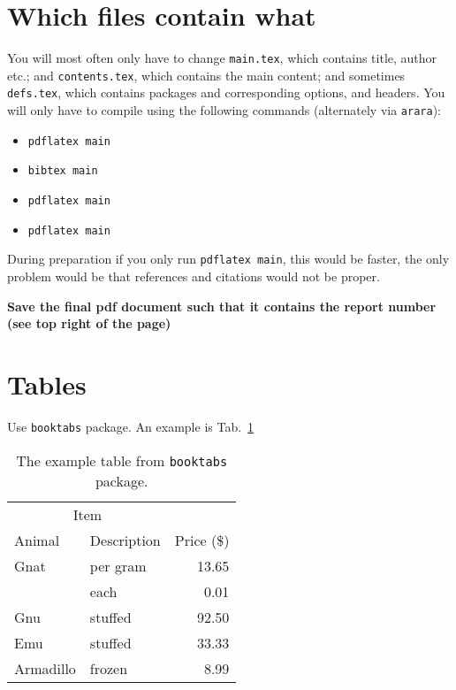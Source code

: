 \lipsum\cite{Karamcheti1956}

\section{Which files contain what}

You will most often only have to change \texttt{main.tex}, which contains
title, author etc.; and \texttt{contents.tex}, which contains the main content;
and sometimes \texttt{defs.tex}, which contains packages and corresponding
options, and headers. You will only have to compile using the following
commands (alternately via \texttt{arara}):
\begin{itemize}
	\item \texttt{pdflatex main}
	\item \texttt{bibtex main}
	\item \texttt{pdflatex main}
	\item \texttt{pdflatex main}
\end{itemize}

During preparation if you only run \texttt{pdflatex main}, this would be
faster, the only problem would be that references and citations would not be
proper.

\textbf{Save the final pdf document such that it contains the report number
(see top right of the page)}

\section{Tables}

Use \texttt{booktabs} package. An example is Tab.~\ref{tb:sample}

\begin{table}
\caption{The example table from \texttt{booktabs} package.}
	\label{tb:sample}
	\centering
\begin{tabular}{@{}llr@{}}
\toprule
\multicolumn{2}{c}{Item} \\
\cmidrule(r){1-2}Animal & Description & Price (\$)\\
\midrule
Gnat  & per gram  & 13.65 \\
& each      & 0.01 \\
Gnu   & stuffed   & 92.50 \\
Emu   & stuffed   & 33.33 \\
Armadillo & frozen & 8.99 \\
\bottomrule
\end{tabular}
\end{table}

